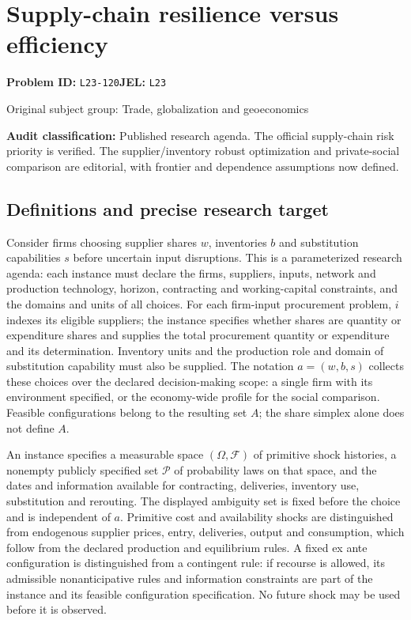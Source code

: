 \documentclass[11pt,a4paper]{article}
\begin{document}
\section*{Supply-chain resilience versus efficiency}
\textbf{Problem ID:} \texttt{L23-120}\quad \textbf{JEL:} \texttt{L23}\par
\label{problem:OP-0345}
\label{audited:ECON-080}
{\sffamily\small\color{muted}Original subject group: Trade, globalization and geoeconomics\par}
\label{definitions:problem:30007627}
\textbf{Audit classification:} Published research agenda. The official supply-chain risk priority is verified. The supplier/inventory robust optimization and private-social comparison are editorial, with frontier and dependence assumptions now defined.
\subsection*{Definitions and precise research target}
Consider firms choosing supplier shares \(w\), inventories \(b\) and substitution capabilities \(s\) before uncertain input disruptions. This is a parameterized research agenda: each instance must declare the firms, suppliers, inputs, network and production technology, horizon, contracting and working-capital constraints, and the domains and units of all choices. For each firm-input procurement problem, \(i\) indexes its eligible suppliers; the instance specifies whether shares are quantity or expenditure shares and supplies the total procurement quantity or expenditure and its determination. Inventory units and the production role and domain of substitution capability must also be supplied. The notation \(a=(w,b,s)\) collects these choices over the declared decision-making scope: a single firm with its environment specified, or the economy-wide profile for the social comparison. Feasible configurations belong to the resulting set \(A\); the share simplex alone does not define \(A\).

An instance specifies a measurable space \((\Omega,\mathcal F)\) of primitive shock histories, a nonempty publicly specified set \(\mathcal P\) of probability laws on that space, and the dates and information available for contracting, deliveries, inventory use, substitution and rerouting. The displayed ambiguity set is fixed before the choice and is independent of \(a\). Primitive cost and availability shocks are distinguished from endogenous supplier prices, entry, deliveries, output and consumption, which follow from the declared production and equilibrium rules. A fixed ex ante configuration is distinguished from a contingent rule: if recourse is allowed, its admissible nonanticipative rules and information constraints are part of the instance and its feasible configuration specification. No future shock may be used before it is observed.
\end{document}
